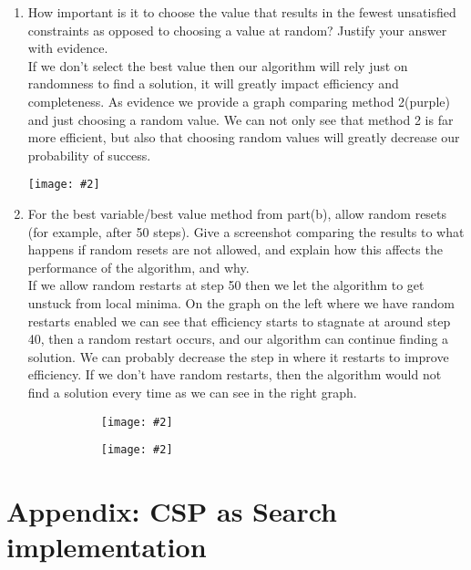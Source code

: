 \documentclass{article}
\def\ans#1{{\color{ans}#1}}
\newcommand{\centerfig}[2]{\begin{center}\texttt{[image: \#2]}\end{center}}
\begin{document}
\begin{enumerate}[label=(\alph*)]
{    }
    \begin{center}
        \begin{figure}[htp]
        \begin{subfigure}[b]{0.5\textwidth} \color{ans}
            \centerfig{1}{../figs/q4_c_1.png}
        \end{subfigure}
        \begin{subfigure}[b]{0.5\textwidth} \color{ans}
            \centerfig{1}{../figs/q4_c_2.png}
        \end{subfigure}
        \end{figure}
    \end{center}
    \item How important is it to choose the value that results in the fewest unsatisfied constraints as opposed to choosing a value at random? Justify your answer with evidence.\\
    \ans{
        If we don’t select the best value then our algorithm will rely just on randomness to find a 
        solution, it will greatly impact efficiency and completeness. As evidence we provide a graph 
        comparing method 2(purple) and just choosing a random value. We can not only see that method 2 
        is far more efficient, but also that choosing random values will greatly decrease our probability 
        of success.
    }
    \centerfig{0.8}{../figs/q4_c_3.png}
    \item For the best variable/best value method from part(b), allow random resets (for example, after 50 steps). Give a screenshot comparing the results to what happens if random resets are not allowed, and explain how this affects the performance of the algorithm, and why.\\
    \ans{
        If we allow random restarts at step 50 then we let the algorithm to get unstuck from local minima. 
        On the graph on the left where we have random restarts enabled we can see that efficiency starts 
        to stagnate at around step 40, then a random restart occurs, and our algorithm can continue 
        finding a solution. We can probably decrease the step in where it restarts to improve efficiency. 
        If we don’t have random restarts, then the algorithm would not find a solution every time as we 
        can see in the right graph.
    }
    \begin{center}
        \begin{figure}[htp]
        \begin{subfigure}[b]{0.5\textwidth} \color{ans}
            \centerfig{1}{../figs/q4_c_4.png}
        \end{subfigure}
        \begin{subfigure}[b]{0.5\textwidth} \color{ans}
            \centerfig{1}{../figs/q4_c_5.png}
        \end{subfigure}
        \end{figure}
    \end{center}
\end{enumerate}

\clearpage
\appendix

\section{Appendix: CSP as Search implementation}
\label{appendix:CSP Search}
\begin{center}
    
\end{center}
\end{document}
